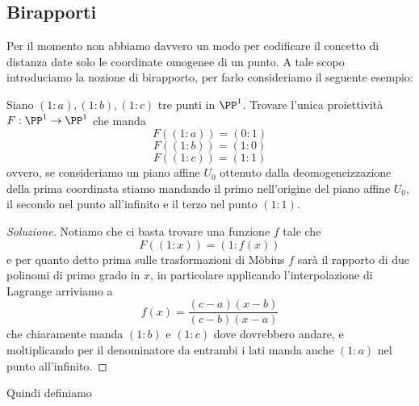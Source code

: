 \documentclass[11pt]{scrartcl}
\begin{document}
   	 \subsection{Birapporti}
   	 Per il momento non abbiamo davvero un modo per codificare il concetto di distanza date solo le coordinate omogenee di un punto. A tale scopo introduciamo la nozione di birapporto, per farlo consideriamo il seguente esempio:
   	 \begin{example}
   	 	Siano $(1:a),(1:b),(1:c)$ tre punti in $\PP^1$. Trovare l'unica proiettività $F:\PP^1\to\PP^1$ che manda 
   	 	$$F((1:a))=(0:1)$$
   	 	$$F((1:b))=(1:0)$$
   	 	$$F((1:c))=(1:1)$$
   	 	ovvero, se consideriamo un piano affine $U_0$ ottenuto dalla deomogeneizzazione della prima coordinata stiamo mandando il primo nell'origine del piano affine $U_0$, il secondo nel punto all'infinito e il terzo nel punto $(1:1)$.
   	 \end{example}
   	 \begin{proof}[Soluzione]
   	 	Notiamo che ci basta trovare una funzione $f$ tale che
   	 	$$F((1:x))=(1:f(x))$$
   	 	e per quanto detto prima sulle trasformazioni di M\"obius $f$ sarà il rapporto di due polinomi di primo grado in $x$, in particolare applicando l'interpolazione di Lagrange arriviamo a 
   	 	$$f(x)=\frac{(c-a)(x-b)}{(c-b)(x-a)}$$
   	 	che chiaramente manda $(1:b)$ e $(1:c)$ dove dovrebbero andare, e moltiplicando per il denominatore da entrambi i lati manda anche $(1:a)$ nel punto all'infinito.
   	 \end{proof}
   	 Quindi definiamo
\end{document}

